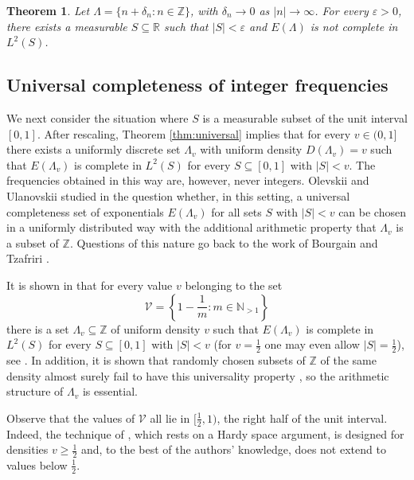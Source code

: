 \documentclass[reqno,a4paper,12pt]{amsart}
\numberwithin{equation}{section}
\newtheorem{theorem}[definition]{Theorem}
\def\N{{\mathbb N}}
\def\Z{{\mathbb Z}}
\def\R{{\mathbb R}}
\newcommand\1{\mathds{1}}
\begin{document}
\begin{theorem}\label{thm:null}
    Let $\Lambda = \{ n+ \delta_n : n \in \Z \}$, with $\delta_n\to 0$ as $|n|\to\infty$. For every $\varepsilon>0$, there exists a measurable $S \subseteq \R$ such that $|S| < \varepsilon$ and $E(\Lambda)$ is not complete in $L^2(S)$.
\end{theorem}


\subsection{Universal completeness of integer frequencies}

We next consider the situation where $S$ is a measurable subset of the unit interval $[0,1]$. After rescaling, Theorem \ref{thm:universal} implies that for every $v \in (0,1]$ there exists a uniformly discrete set $\Lambda_v$ with uniform density $D(\Lambda_v)=v$ such that $E(\Lambda_v)$ is complete in $L^2(S)$ for every $S \subseteq [0,1]$ with $|S|<v$. The frequencies obtained in this way are, however, never integers. Olevskii and Ulanovskii studied in \cite{OlevskiiUlanovskii2008} the question whether, in this setting, a universal completeness set of exponentials $E(\Lambda_v)$ for all sets $S$ with $|S|<v$ can be chosen in a uniformly distributed way with the additional arithmetic property that $\Lambda_v$ is a subset of $\Z$. Questions of this nature go back to the work of Bourgain and Tzafriri \cite{BourgainTzafriri1987}.

It is shown in \cite{OlevskiiUlanovskii2008} that for every value $v$ belonging to the set
$$
\mathcal{V} = \left \{1-\frac1m : m \in \N_{>1}  \right \}
$$
there is a set $\Lambda_v \subseteq \Z$ of uniform density $v$ such that $E(\Lambda_v)$ is complete in $L^2(S)$ for every $S \subseteq [0,1]$ with $|S| < v$ (for $v=\frac12$ one may even allow $|S| = \frac12$), see \cite[Theorems 2.2 and 2.4]{OlevskiiUlanovskii2008}. In addition, it is shown that randomly chosen subsets of $\Z$ of the same density almost surely fail to have this universality property \cite[Theorem 2.5]{OlevskiiUlanovskii2008}, so the arithmetic structure of $\Lambda_v$ is essential. 

Observe that the values of $\mathcal{V}$ all lie in $[\frac12,1)$, the right half of the unit interval. Indeed, the technique of \cite{OlevskiiUlanovskii2008}, which rests on a Hardy space argument, is designed for densities $v \geq \frac12$ and, to the best of the authors' knowledge, does not extend to values below $\frac12$.
\end{document}
